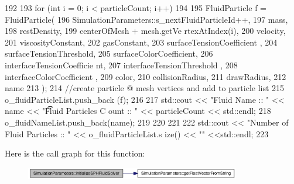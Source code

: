 \begin{DoxyCode}
{{{192 
193                 for (int i = 0; i < particleCount; i++)
194                 {
195                     FluidParticle f = FluidParticle(
196                                                         
      SimulationParameters::s_nextFluidParticleId++,
197                                                         mass,
198                                                         restDensity,
199                                                         centerOfMesh + mesh.getVe
      rtexAtIndex(i),
200                                                         velocity,
201                                                         viscosityConstant,
202                                                         gasConstant,
203                                                         surfaceTensionCoefficient
      ,
204                                                         surfaceTensionThreshold,
205                                                         surfaceColorCoefficient,
206                                                         interfaceTensionCoefficie
      nt,
207                                                         interfaceTensionThreshold
      ,
208                                                         interfaceColorCoefficient
      ,
209                                                         color,
210                                                         collisionRadius,
211                                                         drawRadius,
212                                                         name
213                                                     );
214                     //create particle @ mesh vertices and add to particle list
215                     o_fluidParticleList.push_back (f);
216                 }
217                 std::cout << "Fluid Name :: " << name << "\t \t Fluid Particles C
      ount  :: " << particleCount << std::endl;
218                 o_fluidNameList.push_back(name);
219 
220         }
221     }
222     std::cout << "\nTotal Number of Fluid Particles :: " << o_fluidParticleList.s
      ize() << "\n" <<std::endl;
223 }
\end{DoxyCode}




Here is the call graph for this function:\nopagebreak
\begin{figure}[H]
\begin{center}
\leavevmode
\includegraphics[width=266pt]{class_simulation_parameters_aa9389962f767734ad8f0ffc63cb0ed46_cgraph}
\end{center}
\end{figure}





